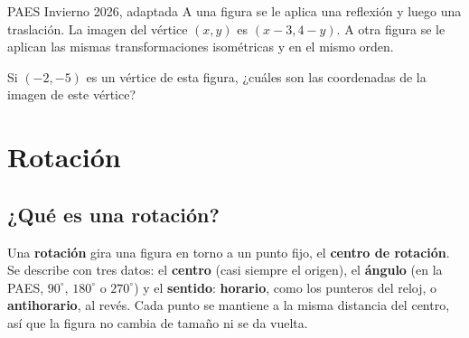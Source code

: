 \begin{elejemplo}{PAES Invierno 2026, adaptada}
A una figura se le aplica una reflexión y luego una traslación. La imagen del vértice $(x, y)$ es $(x - 3, 4 - y)$. A otra figura se le aplican las mismas transformaciones isométricas y en el mismo orden.

Si $(-2, -5)$ es un vértice de esta figura, ¿cuáles son las coordenadas de la imagen de este vértice?
\end{elejemplo}

\section{Rotación}
\subsection{¿Qué es una rotación?}
Una \textbf{rotación} gira una figura en torno a un punto fijo, el \textbf{centro de rotación}. Se describe con tres datos: el \textbf{centro} (casi siempre el origen), el \textbf{ángulo} (en la PAES, $90^\circ$, $180^\circ$ o $270^\circ$) y el \textbf{sentido}: \textbf{horario}, como los punteros del reloj, o \textbf{antihorario}, al revés. Cada punto se mantiene a la misma distancia del centro, así que la figura no cambia de tamaño ni se da vuelta.

